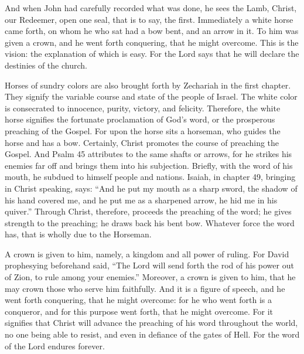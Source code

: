 And when John had carefully recorded what was done, he sees the Lamb, Christ, our Redeemer, open one seal, that is to say, the first. Immediately a white horse came forth, on whom he who sat had a bow bent, and an arrow in it. To him was given a crown, and he went forth conquering, that he might overcome. This is the vision: the explanation of which is easy. For the Lord says that he will declare the destinies of the church.

Horses of sundry colors are also brought forth by Zechariah in the first chapter. They signify the variable course and state of the people of Israel. The white color is consecrated to innocence, purity, victory, and felicity. Therefore, the white horse signifies the fortunate proclamation of God’s word, or the prosperous preaching of the Gospel. For upon the horse sits a horseman, who guides the horse and has a bow. Certainly, Christ promotes the course of preaching the Gospel. And Psalm 45 attributes to the same shafts or arrows, for he strikes his enemies far off and brings them into his subjection. Briefly, with the word of his mouth, he subdued to himself people and nations. Isaiah, in chapter 49, bringing in Christ speaking, says: “And he put my mouth as a sharp sword, the shadow of his hand covered me, and he put me as a sharpened arrow, he hid me in his quiver.” Through Christ, therefore, proceeds the preaching of the word; he gives strength to the preaching; he draws back his bent bow. Whatever force the word has, that is wholly due to the Horseman.

A crown is given to him, namely, a kingdom and all power of ruling. For David prophesying beforehand said, “The Lord will send forth the rod of his power out of Zion, to rule among your enemies.” Moreover, a crown is given to him, that he may crown those who serve him faithfully. And it is a figure of speech, and he went forth conquering, that he might overcome: for he who went forth is a conqueror, and for this purpose went forth, that he might overcome. For it signifies that Christ will advance the preaching of his word throughout the world, no one being able to resist, and even in defiance of the gates of Hell. For the word of the Lord endures forever.

